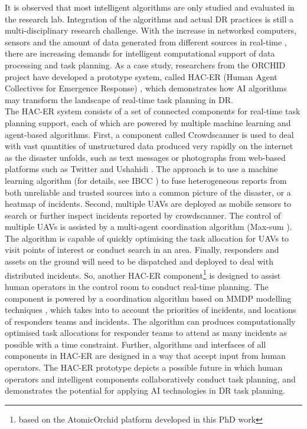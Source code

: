 It is observed that most intelligent algorithms are only studied and evaluated in the research lab. Integration of the algorithms and actual \ac{DR} practices is still a multi-disciplinary research challenge.  With the increase in networked computers, sensors and the amount of data generated from different sources in real-time \citep{Ramchurn2015}, there are increasing demands for intelligent computational support of data processing and task planning. As a case study, researchers from the ORCHID project have developed a prototype system, called HAC-ER (Human Agent Collectives for Emergence Response) \citep{Jennings2014,Ramchurn2015,Ramchurn2015a}, which demonstrates how \ac{AI} algorithms may transform the landscape of real-time task planning in \ac{DR}.\\

The \ac{HAC-ER} system consists of a set of connected components for real-time task planning support, each of which are powered by multiple machine learning and agent-based algorithms. First, a component called Crowdscanner is used to deal with vast quantities of unstructured data produced very rapidly on the internet as the disaster unfolds, such as text messages or photographs from web-based platforms such as Twitter and Ushahidi \citep{Morrow2011}. The approach is to use a machine learning algorithm (for details, see IBCC \citep{Simpson}) to fuse heterogeneous reports from both unreliable and trusted sources into a common picture of the disaster, or a heatmap of incidents. Second, multiple  \acf{UAV}s are deployed as mobile sensors to search or further inspect incidents reported by crowdscanner. The control of multiple \ac{UAV}s is assisted by a multi-agent coordination algorithm (Max-sum \citep{Ramchurn2010}). The algorithm is capable of quickly optimising the task allocation for \ac{UAV}s to visit points of interest or conduct search in an area.  Finally, responders and assets on the ground will need to be dispatched and deployed to deal with distributed incidents. So, another \ac{HAC-ER} component\footnote{based on the AtomicOrchid platform developed in this PhD work} is designed to assist human operators in the control room to conduct real-time planning. The component is powered by a coordination algorithm based on MMDP modelling techniques \citep{Wu2015}, which takes into to account the priorities of incidents, and locations of responders teams and incidents. The algorithm can produces computationally optimised task allocations for responder teams to attend as many incidents as possible with a time constraint. Further, algorithms and interfaces of all components in \ac{HAC-ER} are designed in a way that accept input from human operators. The \ac{HAC-ER} prototype depicts a possible future in which human operators and intelligent components collaboratively conduct task planning, and demonstrates the potential for applying \ac{AI} technologies in \ac{DR} task planning.\\

